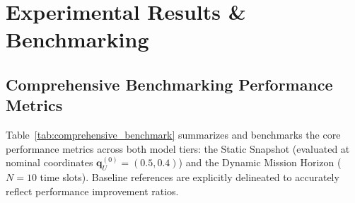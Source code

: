 \section{Experimental Results \& Benchmarking}
\label{sec:results_benchmarking}

\subsection*{Comprehensive Benchmarking Performance Metrics}

Table~\ref{tab:comprehensive_benchmark} summarizes and benchmarks the core performance metrics across both model tiers: the Static Snapshot (evaluated at nominal coordinates $\mathbf{q}_U^{(0)} = (0.5, 0.4)$) and the Dynamic Mission Horizon ($N = 10$ time slots). Baseline references are explicitly delineated to accurately reflect performance improvement ratios.

